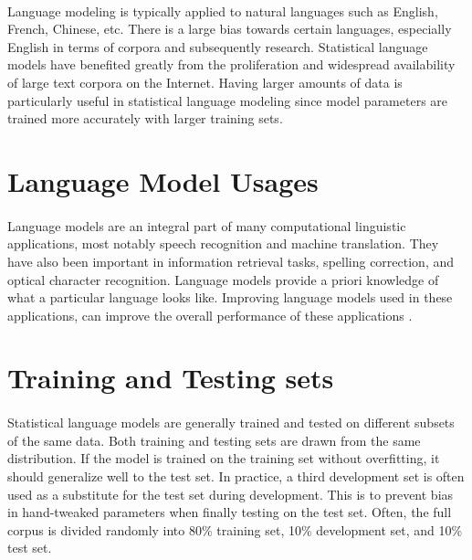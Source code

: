 \paragraph{}
Language modeling is typically applied to natural languages such as English, French, Chinese, etc. There is a large bias towards certain languages, especially English in terms of corpora and subsequently research. Statistical language models have benefited greatly from the proliferation and widespread availability of large text corpora on the Internet.  Having larger amounts of data is particularly useful in statistical language modeling since model parameters are trained more accurately with larger training sets. 

\section{Language Model Usages}
\paragraph{}
Language models are an integral part of many computational linguistic applications, most notably speech recognition and machine translation. They have also been important in information retrieval tasks, spelling correction, and optical character recognition. Language models provide a priori knowledge of what a particular language looks like. Improving language models used in these applications, can improve the overall performance of these applications \cite{Jurafsky2009}. 

\section{Training and Testing sets}
\paragraph{}
Statistical language models are generally trained and tested on different subsets of the same data. Both training and testing sets are drawn from the same distribution. If the model is trained on the training set without overfitting, it should generalize well to the test set. In practice, a third development set is often used as a substitute for the test set during development. This is to prevent bias in hand-tweaked parameters when finally testing on the test set. Often, the full corpus is divided randomly into 80\% training set, 10\% development set, and 10\% test set.

